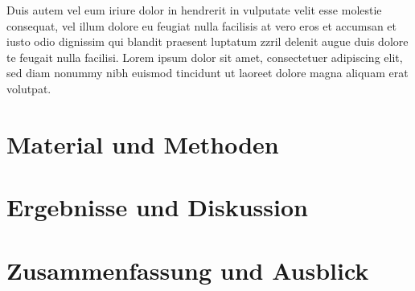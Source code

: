 \documentclass[ %
	DIV=15, %
	BCOR=14mm, %
	parskip=half, %
	headsepline, %
	cleardoublepage=empty, %
	tablecaptionabove, %
	toc=bib, %
	toc=listofnumbered, %
	listof=leveldown, %
	numbers=noendperiod %
	]{scrbook}
\renewcommand\appendix{\par
	\addchap{\appendixname}
	\setcounter{section}{0}%
	\setcounter{subsection}{0}%
	\setcounter{figure}{0}%
	\renewcommand\thesection{\Alph{section}}%
	\renewcommand\thefigure{\Alph{section}.\arabic{figure}}
	\renewcommand\thetable{\Alph{section}.\arabic{table}}
}
\begin{document}
Duis autem vel eum iriure dolor in hendrerit in vulputate velit esse molestie consequat, vel illum dolore eu feugiat nulla facilisis at vero eros et accumsan et iusto odio dignissim qui blandit praesent luptatum zzril delenit augue duis dolore te feugait nulla facilisi. Lorem ipsum dolor sit amet, consectetuer adipiscing elit, sed diam nonummy nibh euismod tincidunt ut laoreet dolore magna aliquam erat volutpat.



\chapter{Material und Methoden} %
\label{cha:material_und_methoden}


\chapter{Ergebnisse und Diskussion} %
\label{cha:ergebnisse_und_diskussion}


\chapter{Zusammenfassung und Ausblick} %
\label{cha:zusammenfassung_und_ausblick}


\printbibliography

\appendix

\listoffigures

\listoftables

\lstlistoflistings
\end{document}

